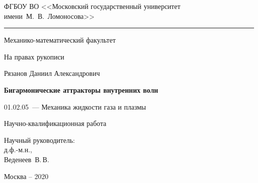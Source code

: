\thispagestyle{empty}

{
\singlespacing
\begin{center}
ФГБОУ ВО <<Московский государственный университет имени~М.~В.~Ломоносова>>
\medskip
\hrule
\medskip
Механико-математический факультет
\end{center}

\vspace{20mm}
\begin{flushright}
На правах рукописи

\end{flushright}

\vspace{25mm}
\begin{center}
{\large Рязанов Даниил Александрович}
\end{center}

\vspace{5mm}
\begin{center}
{\bf \large Бигармонические аттракторы внутренних волн 
\par}

\vspace{10mm}
{
01.02.05~--- Механика жидкости газа и плазмы
}





\vspace{10mm}
Научно-квалификационная работа
\end{center}

\vspace{16mm}
\begin{flushright}
Научный руководитель:\\[2mm]
д.ф.-м.н., \\
Веденеев~В.\,В.\\

\end{flushright}

\vfill
\begin{center}
{Москва -- 2020}
\end{center}
}
\newpage
\restoregeometry